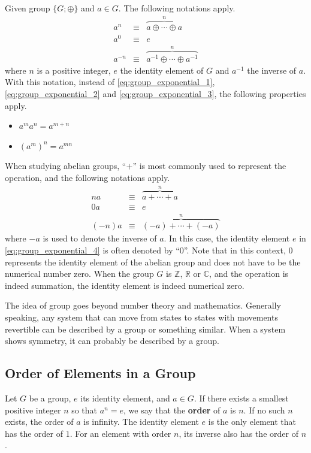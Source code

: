 Given group $\{G;\oplus\}$ and $a\in G$. The following notations apply.
\begin{eqnarray}
  a^n &\equiv&  \overbrace{a \oplus \cdots \oplus a}^{n} \label{eq:group_exponential_1} \\
  a^0 &\equiv& e \label{eq:group_exponential_2} \\
  a^{-n} &\equiv& \overbrace{a^{-1} \oplus \cdots \oplus a^{-1}}^{n} \label{eq:group_exponential_3}
\end{eqnarray}
where $n$ is a positive integer, $e$ the identity element of $G$ and $a^{-1}$ the inverse of $a$. With this notation, instead of \eqref{eq:group_exponential_1}, \eqref{eq:group_exponential_2} and \eqref{eq:group_exponential_3}, the following properties apply.
\begin{itemize}
  \item $a^ma^n = a^{m+n}$
  \item $\left(a^m\right)^n = a^{mn}$
\end{itemize}

When studying abelian groups, ``$+$'' is most commonly used to represent the operation, and the following notations apply.
\begin{eqnarray}
  na &\equiv& \overbrace{a + \cdots + a}^{n} \nonumber \\
  0a &\equiv& e \label{eq:group_exponential_4} \\
  (-n)a &\equiv& \overbrace{(-a) + \cdots + (-a)}^{n} \nonumber
\end{eqnarray}
where $-a$ is used to denote the inverse of $a$. In this case, the identity element $e$ in \eqref{eq:group_exponential_4} is often denoted by ``$0$''. Note that in this context, $0$ represents the identity element of the abelian group and does not have to be the numerical number zero. When the group $G$ is $\mathbb{Z}$, $\mathbb{R}$ or $\mathbb{C}$, and the operation is indeed summation, the identity element is indeed numerical zero.

The idea of group goes beyond number theory and mathematics. Generally speaking, any system that can move from states to states with movements revertible can be described by a group or something similar. When a system shows symmetry, it can probably be described by a group.

\subsection{Order of Elements in a Group}

Let $G$ be a group, $e$ its identity element, and $a\in G$. If there exists a smallest positive integer $n$ so that $a^n = e$, we say that the \textbf{order} of $a$ is $n$. If no such $n$ exists, the order of $a$ is infinity. The identity element $e$ is the only element that has the order of $1$. For an element with order $n$, its inverse also has the order of $n$.

